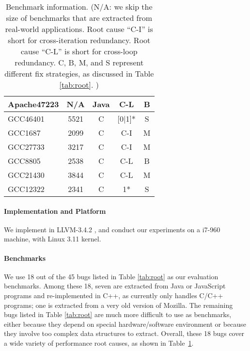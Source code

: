 \begin{table}
\begin{tabular}{lcccc}
   Apache47223           & N/A             & Java                   &  C-L         & B \\
   \midrule
   GCC46401              & 5521            & C                      &  [0$|$1]*    & S   \\
   GCC1687               & 2099            & C                      &  C-I         & M \\
   GCC27733              & 3217            & C                      &  C-I         & M \\
   GCC8805               & 2538            & C                      &  C-L         & B\\
   GCC21430              & 3844            & C                      &  C-L         & M \\
   GCC12322              & 2341            & C                      &  1*          & S\\
\bottomrule
   \end{tabular}
  \caption{Benchmark information.
  (N/A: we skip the size of benchmarks that are extracted from real-world applications.
  Root cause ``C-I'' is short for cross-iteration redundancy.
  Root cause ``C-L'' is short for cross-loop redundancy.
  C, B, M, and S represent different fix strategies, as discussed in
  Table \ref{tab:root}.
  ) 
 }
  \label{tab:benchmarks}
\end{table}

\paragraph{Implementation and Platform}
We implement \Tool in LLVM-3.4.2 \citep{llvm}, and conduct our
experiments on a i7-960 machine, with Linux 3.11 kernel. 

\paragraph{Benchmarks}
We use 18 out of the 45 bugs listed in Table \ref{tab:root} as our 
evaluation benchmarks. Among these 18, seven are extracted from Java or JavaScript
programs and re-implemented in C++, as \Tool currently only handles C/C++
programs; one is extracted from a very old version of Mozilla.
The remaining bugs listed in Table \ref{tab:root} are much more difficult to
use as benchmarks, 
either because they depend on special hardware/software environment
or because they involve too complex data structures to extract. 
Overall, these 18 bugs cover a wide variety of performance root causes, as 
shown in Table~\ref{tab:benchmarks}. 

